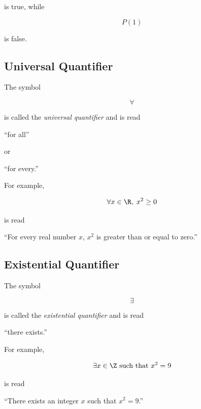 is true, while

\[ P(1) \]

is false.

\subsection{Universal Quantifier}
\label{subsec:universal-quantifier}

The symbol

\[ \forall \]

is called the \emph{universal quantifier} and is read

\begin{center}
``for all''
\end{center}

or

\begin{center}
``for every.''
\end{center}

For example,

\[ \forall x\in\R,\;x^2\geq0 \]

is read

\begin{center}
``For every real number \(x\), \(x^2\) is greater than or equal to zero.''
\end{center}

\subsection{Existential Quantifier}
\label{subsec:existential-quantifier}

The symbol

\[ \exists \]

is called the \emph{existential quantifier} and is read

\begin{center}
``there exists.''
\end{center}

For example,

\[ \exists x\in\Z\text{ such that }x^2=9 \]

is read

\begin{center}
``There exists an integer \(x\) such that \(x^2=9\).''
\end{center}

